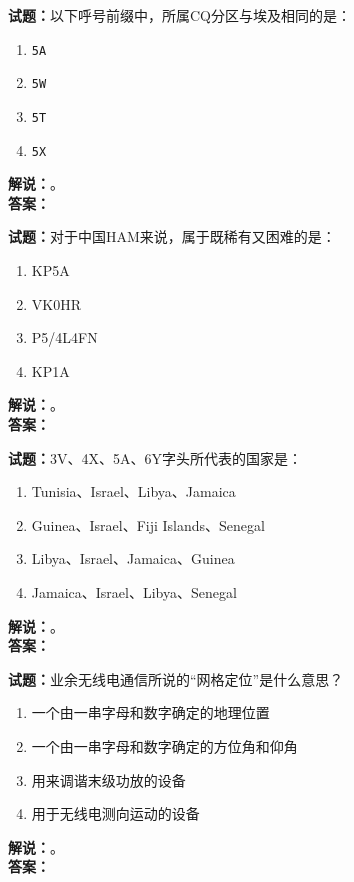 \documentclass{ctexbook}
\begin{document}
\noindent\textbf{试题：}以下呼号前缀中，所属CQ分区与埃及相同的是：
\begin{enumerate}[leftmargin=3em]
\item \texttt{5A}
\item \texttt{5W}
\item \texttt{5T}
\item \texttt{5X}
\end{enumerate}
\noindent\textbf{解说：}\textbf{}。\\\noindent\textbf{答案：}

\bigskip




\noindent\textbf{试题：}对于中国HAM来说，属于既稀有又困难的是：
\begin{enumerate}[leftmargin=3em]
\item KP5A
\item VK0HR
\item P5/4L4FN
\item KP1A
\end{enumerate}
\noindent\textbf{解说：}\textbf{}。\\\noindent\textbf{答案：}

\bigskip




\noindent\textbf{试题：}3V、4X、5A、6Y字头所代表的国家是：
\begin{enumerate}[leftmargin=3em]
\item Tunisia、Israel、Libya、Jamaica %
\item Guinea、Israel、Fiji Islands、Senegal
\item Libya、Israel、Jamaica、Guinea
\item Jamaica、Israel、Libya、Senegal
\end{enumerate}
\noindent\textbf{解说：}\textbf{}。\\\noindent\textbf{答案：}

\bigskip




\noindent\textbf{试题：}业余无线电通信所说的“网格定位”是什么意思？
\begin{enumerate}[leftmargin=3em]
\item 一个由一串字母和数字确定的地理位置 %
\item 一个由一串字母和数字确定的方位角和仰角
\item 用来调谐末级功放的设备
\item 用于无线电测向运动的设备
\end{enumerate}
\noindent\textbf{解说：}\textbf{}。\\\noindent\textbf{答案：}
\end{document}
